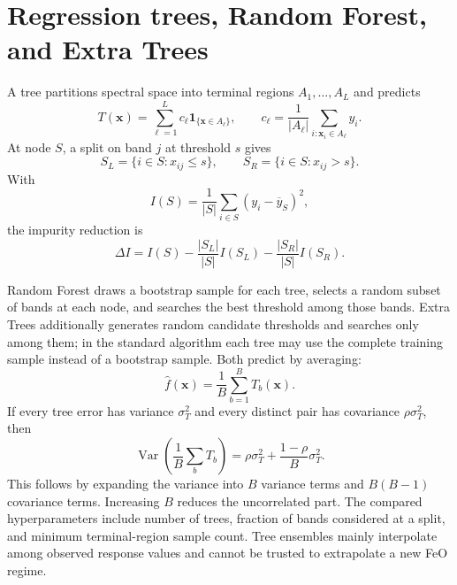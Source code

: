 \documentclass[11pt]{article}
\newcommand{\Var}{\operatorname{Var}}
\begin{document}
\section{Regression trees, Random Forest, and Extra Trees}
A tree partitions spectral space into terminal regions $A_1,\ldots,A_L$ and predicts
\begin{equation}
 T(\bm x)=\sum_{\ell=1}^{L}c_\ell\mathbf1_{\{\bm x\in A_\ell\}},
 \qquad c_\ell=\frac1{|A_\ell|}\sum_{i:\bm x_i\in A_\ell}y_i.
\end{equation}
At node $S$, a split on band $j$ at threshold $s$ gives
\begin{equation}
 S_L=\{i\in S:x_{ij}\le s\},\qquad S_R=\{i\in S:x_{ij}>s\}.
\end{equation}
With
\begin{equation}
 I(S)=\frac1{|S|}\sum_{i\in S}(y_i-\overline y_S)^2,
\end{equation}
the impurity reduction is
\begin{equation}
 \Delta I=I(S)-\frac{|S_L|}{|S|}I(S_L)-\frac{|S_R|}{|S|}I(S_R).
\end{equation}

Random Forest draws a bootstrap sample for each tree, selects a random subset of bands at each node, and searches the best threshold among those bands. Extra Trees additionally generates random candidate thresholds and searches only among them; in the standard algorithm each tree may use the complete training sample instead of a bootstrap sample. Both predict by averaging:
\begin{equation}
 \widehat f(\bm x)=\frac1B\sum_{b=1}^{B}T_b(\bm x).
\end{equation}
If every tree error has variance $\sigma_T^2$ and every distinct pair has covariance $\rho\sigma_T^2$, then
\begin{equation}
 \Var\!\left(\frac1B\sum_bT_b\right)
 =\rho\sigma_T^2+\frac{1-\rho}{B}\sigma_T^2.
\end{equation}
This follows by expanding the variance into $B$ variance terms and $B(B-1)$ covariance terms. Increasing $B$ reduces the uncorrelated part. The compared hyperparameters include number of trees, fraction of bands considered at a split, and minimum terminal-region sample count. Tree ensembles mainly interpolate among observed response values and cannot be trusted to extrapolate a new FeO regime.
\end{document}
